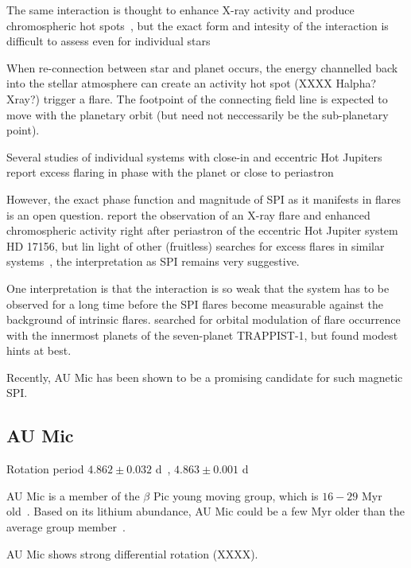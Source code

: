 \documentclass[fleqn,usenatbib,letters]{mnras}%
\begin{document}
The same interaction is thought to enhance X-ray activity and produce chromospheric hot spots~\citep{lanza2009}, but the exact form and intesity of the interaction is difficult to assess even for individual stars~\citep{strugarek2019}

When re-connection between star and planet occurs, the energy channelled back into the stellar atmosphere can create an activity hot spot (XXXX Halpha? Xray?) trigger a flare. The footpoint of the connecting field line is expected to move with the planetary orbit (but need not neccessarily be the sub-planetary point).

Several studies of individual systems with close-in and eccentric Hot Jupiters report excess flaring in phase with the planet or close to periastron~\citep{shkolnik2005,pillitteri2011,maggio2015}

However, the exact phase function and magnitude of SPI as it manifests in flares is an open question. \citet{maggio2015} report the observation of an X-ray flare and enhanced chromospheric activity right after periastron of the eccentric Hot Jupiter system HD 17156, but lin light of other (fruitless) searches for excess flares in similar systems~\citep{figueira2016}, the interpretation as SPI remains very suggestive. 

One interpretation is that the interaction is so weak that the system has to be observed for a long time before the SPI flares become measurable against the background of intrinsic flares. \citet{fischer2019} searched for orbital modulation of flare occurrence with the innermost planets of the seven-planet TRAPPIST-1, but found modest hints at best. 

Recently, AU Mic has been shown to be a promising candidate for such magnetic SPI. 


\subsection{AU Mic}
Rotation period $4.862\pm 0.032$ d~\citep{martioli2021}, $4.863\pm 0.001$ d~\citep{plavchan2020}

AU Mic is a member of the $\beta$ Pic young moving group, which is $16-29$ Myr old~\citep{malo2014,binks2014,mamajek2014,bell2015,binks2016,shkolnik2017,miretroig2020}. Based on its lithium abundance, AU Mic could be a few Myr older than the average group member~\citep{malo2014}. 

AU Mic shows strong differential rotation (XXXX).
\end{document}
